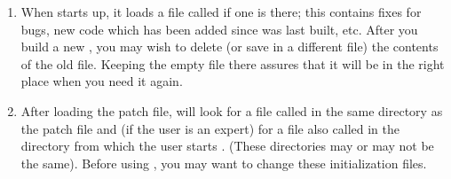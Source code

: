 \begin{enumerate}
\item When {\TPS} starts up, it loads a file called  if one is
there; this contains fixes for bugs, new code which has been added
since {\TPS} was last built, etc. 
After you build a new {\TPS}, you may wish to delete (or save in a
different file) the contents of the old  file. Keeping the
empty file there assures that it will be in the right place when you
need it again.

\item After loading the patch file, {\TPS} will look for a file called 
in the same directory as the patch file and (if the user is an expert)
for a file also called 
in the directory from which the user starts {\TPS}.  (These directories may or may not be the same).
Before using {\TPS}, you may want to change these initialization files.
\end{enumerate}


